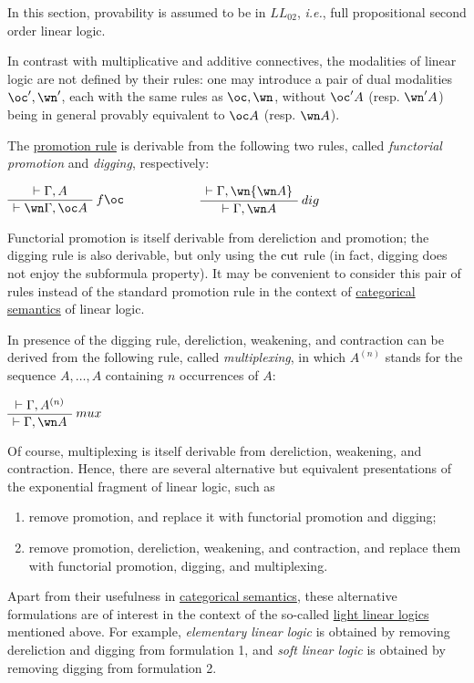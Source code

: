 In this section, provability is assumed to be in \(LL_{02}\),
\emph{i.e.}, full propositional second order linear logic.

In contrast with multiplicative and additive connectives, the modalities
of linear logic are not defined by their rules: one may introduce a pair
of dual modalities \(\oc',\wn'\), each with the same rules as
\(\oc,\wn\), without \(\oc'A\) (resp. \(\wn'A\)) being in general
provably equivalent to \(\oc A\) (resp. \(\wn A\)).

The \href{Sequent_calculus\#Sequents_and_proofs}{promotion rule} is
derivable from the following two rules, called \emph{functorial
promotion} and \emph{digging}, respectively:

\(\AxRule{\vdash\Gamma,A}
\LabelRule{f\oc}
\UnaRule{\vdash\wn\Gamma,\oc A}
\DisplayProof
\qquad\qquad\qquad
\AxRule{\vdash\Gamma,\wn{\wn A}}
\LabelRule{dig}
\UnaRule{\vdash\Gamma,\wn A}
\DisplayProof\)

Functorial promotion is itself derivable from dereliction and promotion;
the digging rule is also derivable, but only using the
\(\operatorname{cut}\) rule (in fact, digging does not enjoy the subformula
property). It may be convenient to consider this pair of rules instead
of the standard promotion rule in the context of
\href{categorical_semantics}{categorical semantics} of linear logic.

In presence of the digging rule, dereliction, weakening, and contraction
can be derived from the following rule, called \emph{multiplexing}, in
which \(A^{(n)}\) stands for the sequence \(A,\ldots,A\) containing
\(n\) occurrences of \(A\):

\(\AxRule{\vdash\Gamma,A^{(n)}}
\LabelRule{mux}
\UnaRule{\vdash\Gamma,\wn A}
\DisplayProof\)

Of course, multiplexing is itself derivable from dereliction, weakening,
and contraction. Hence, there are several alternative but equivalent
presentations of the exponential fragment of linear logic, such as

\begin{enumerate}
\tightlist
\item
  remove promotion, and replace it with functorial promotion and
  digging;
\item
  remove promotion, dereliction, weakening, and contraction, and replace
  them with functorial promotion, digging, and multiplexing.
\end{enumerate}

Apart from their usefulness in \href{categorical_semantics}{categorical
semantics}, these alternative formulations are of interest in the
context of the so-called \href{light_linear_logics}{light linear logics}
mentioned above. For example, \emph{elementary linear logic} is obtained
by removing dereliction and digging from formulation 1, and \emph{soft
linear logic} is obtained by removing digging from formulation 2.

